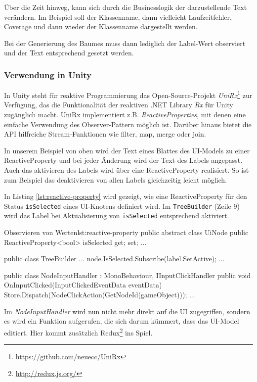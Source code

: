 Über die Zeit hinweg, kann sich durch die Businesslogik der darzustellende Text verändern. Im Beispiel soll der Klassenname, dann vielleicht Laufzeitfehler, Coverage und dann wieder der Klassenname dargestellt werden.

Bei der Generierung des Baumes muss dann lediglich der Label-Wert observiert und der Text entsprechend gesetzt werden.

\subsubsection*{Verwendung in Unity}

In Unity steht für reaktive Programmierung das Open-Source-Projekt \textit{UniRx}\footnote{\url{https://github.com/neuecc/UniRx}} zur Verfügung, das die Funktionalität der reaktiven .NET Library \textit{Rx} für Unity zugänglich macht. UniRx implementiert z.B. \textit{ReactiveProperties}, mit denen eine einfache Verwendung des Observer-Pattern möglich ist. Darüber hinaus bietet die API hilfreiche Stream-Funktionen wie filter, map, merge oder join.

In unserem Beispiel von oben wird der Text eines Blattes des UI-Models zu einer ReactiveProperty und bei jeder Änderung wird der Text des Labels angepasst. Auch das aktivieren des Labels wird über eine ReactiveProperty realisiert. So ist zum Beispiel das deaktivieren von allen Labels gleichzeitig leicht möglich.

In Listing \ref{lst:reactive-property} wird gezeigt, wie eine ReactiveProperty für den Status \texttt{isSelected} eines UI-Knotens definiert wird. Im \texttt{TreeBuilder} (Zeile 9) wird das Label bei Aktualisierung von \texttt{isSelected} entsprechend aktiviert.

\begin{codesnippet}{Observieren von Werten}{lst:reactive-property}
public abstract class UiNode
{
    public ReactiveProperty<bool> isSelected { get; set; }
    ...
}

public class TreeBuilder {
    ...
    node.IsSelected.Subscribe(label.SetActive);
    ...
}

public class NodeInputHandler : MonoBehaviour, IInputClickHandler
{
    public void OnInputClicked(InputClickedEventData eventData)
    {
        Store.Dispatch(NodeClickAction(GetNodeId(gameObject)));
    }
    ...
}
\end{codesnippet}

Im \textit{NodeInputHandler} wird nun nicht mehr direkt auf die UI zugegriffen, sondern es wird ein Funktion aufgerufen, die sich darum kümmert, dass das UI-Model editiert. Hier kommt zusätzlich Redux\footnote{\url{http://redux.js.org/}} ins Spiel.

